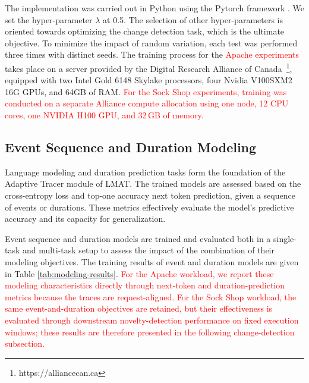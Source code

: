 \documentclass[preprint,12pt]{elsarticle}
\begin{document}
The implementation was carried out in Python using the Pytorch framework \cite{paszke2019pytorch}. We set the hyper-parameter $\lambda$ at 0.5. The selection of other hyper-parameters is oriented towards optimizing the change detection task, which is the ultimate objective. To minimize the impact of random variation, each test was performed three times with distinct seeds. The training process for the \textcolor{red}{Apache experiments} takes place on a server provided by the Digital Research Alliance of Canada~\footnote{https://alliancecan.ca}, equipped with two Intel Gold 6148 Skylake processors, four Nvidia V100SXM2 16G GPUs, and 64GB of RAM. \textcolor{red}{For the Sock Shop experiments, training was conducted on a separate Alliance compute allocation using one node, 12 CPU cores, one NVIDIA H100 GPU, and 32\,GB of memory.}


\subsection{Event Sequence and Duration Modeling}
Language modeling and duration prediction tasks form the foundation of the Adaptive Tracer module of LMAT. The trained models are assessed based on the cross-entropy loss and top-one accuracy next token prediction, given a sequence of events or durations. These metrics effectively evaluate the model's predictive accuracy and its capacity for generalization.

Event sequence and duration models are trained and evaluated both in a single-task and multi-task setup to assess the impact of the combination of their modeling objectives. The training results of event and duration models are given in Table \ref{tab:modeling-results}. \textcolor{red}{For the Apache workload, we report these modeling characteristics directly through next-token and duration-prediction metrics because the traces are request-aligned. For the Sock Shop workload, the same event-and-duration objectives are retained, but their effectiveness is evaluated through downstream novelty-detection performance on fixed execution windows; these results are therefore presented in the following change-detection subsection.}
\end{document}
